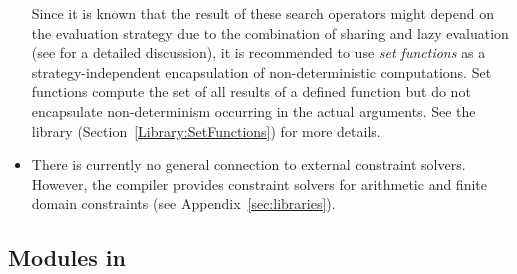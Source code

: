 \begin{itemize}
Since it is known that the result of these search operators might
depend on the evaluation strategy due to the combination of
sharing and lazy evaluation
(see \cite{BrasselHanusHuch04JFLP} for a detailed discussion),
it is recommended to use
\emph{set functions} \cite{AntoyHanus09}
as a strategy-independent encapsulation of non-deterministic
computations.
Set functions compute the set of all results of a defined function
but do not encapsulate non-determinism occurring in the actual arguments.
See the library 
(Section~\ref{Library:SetFunctions}) for more details.
\item
There is currently no general connection to external constraint solvers.
However, the \CYS compiler provides constraint
solvers for arithmetic and finite domain constraints
(see Appendix~\ref{sec:libraries}).
\end{itemize}

%



\subsection{Modules in \CYS}
\label{sec-modules}


